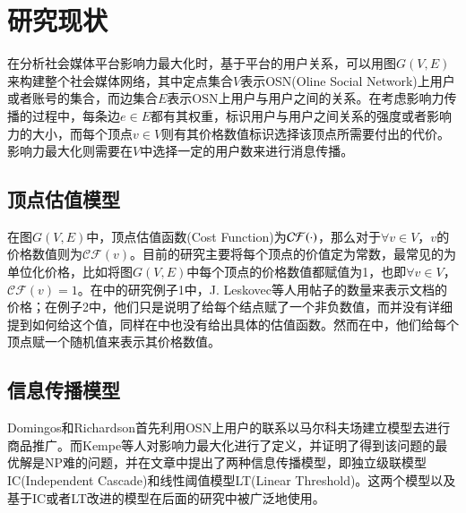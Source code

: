 \section{研究现状}
在分析社会媒体平台影响力最大化时，基于平台的用户关系，可以用图$G(V, E)$来构建整个社会媒体网络，其中定点集合$V$表示OSN(Oline Social Network)上用户或者账号的集合，而边集合$E$表示OSN上用户与用户之间的关系。在考虑影响力传播的过程中，每条边$e \in E$都有其权重，标识用户与用户之间关系的强度或者影响力的大小，而每个顶点$v \in V$则有其价格数值标识选择该顶点所需要付出的代价。影响力最大化则需要在$V$中选择一定的用户数来进行消息传播。


\subsection{顶点估值模型}
在图$G(V, E)$中，顶点估值函数(Cost Function)为$\mathcal{CF}(\boldmath\cdot)$，那么对于$\forall v \in V$，$v$的价格数值则为$\mathcal{CF}(v)$。目前的研究主要将每个顶点的价值定为常数，最常见的为单位化价格，比如\cite{he2012influence}\cite{kempe2003maximizing}\cite{chen2011influence}\cite{chen2010scalableKDD}\cite{chen2009efficient}将图$G(V, E)$中每个顶点的价格数值都赋值为1，也即$\forall v \in V$，$\mathcal{CF}(v) = 1$。在\cite{leskovec2007cost}中的研究例子1中，J. Leskovec等人用帖子的数量来表示文档的价格；在例子2中，他们只是说明了给每个结点赋了一个非负数值，而并没有详细提到如何给这个值，同样在\cite{han2014balanced}中也没有给出具体的估值函数。然而在\cite{nguyen2013budgeted}中，他们给每个顶点赋一个随机值来表示其价格数值。


\subsection{信息传播模型}
Domingos\cite{domingos2001mining}和Richardson\cite{richardson2002mining}首先利用OSN上用户的联系以马尔科夫场建立模型去进行商品推广。而Kempe\cite{kempe2003maximizing}等人对影响力最大化进行了定义，并证明了得到该问题的最优解是NP难的问题，并在文章中提出了两种信息传播模型，即独立级联模型IC(Independent Cascade)和线性阈值模型LT(Linear Threshold)。这两个模型以及基于IC或者LT改进的模型在后面的研究中被广泛地使用。


